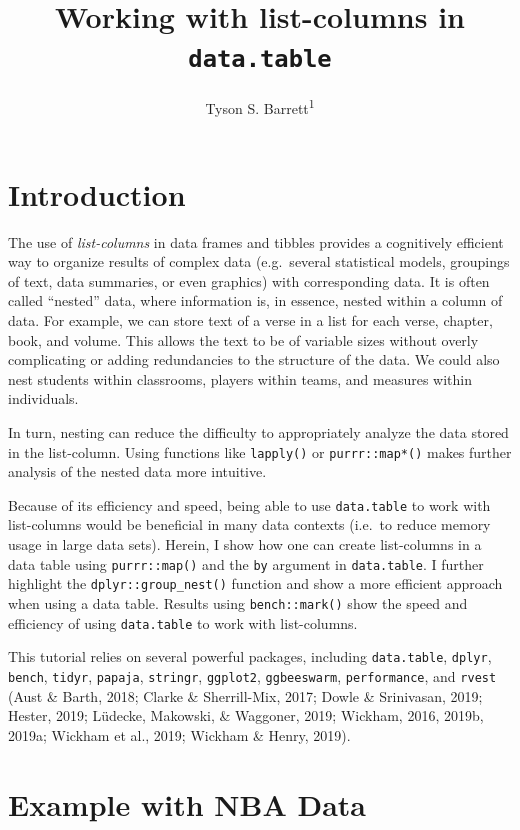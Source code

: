 \documentclass[doc]{apa6}
\title{Working with list-columns in \texttt{data.table}}
\author{Tyson S. Barrett\textsuperscript{1}}
\date{}
\affiliation{
\vspace{0.5cm}
\textsuperscript{1} Utah State University}
\begin{document}
\maketitle

\hypertarget{introduction}{%
\section{Introduction}\label{introduction}}

The use of \emph{list-columns} in data frames and tibbles provides a cognitively efficient way to organize results of complex data (e.g.~several statistical models, groupings of text, data summaries, or even graphics) with corresponding data. It is often called \enquote{nested} data, where information is, in essence, nested within a column of data. For example, we can store text of a verse in a list for each verse, chapter, book, and volume. This allows the text to be of variable sizes without overly complicating or adding redundancies to the structure of the data. We could also nest students within classrooms, players within teams, and measures within individuals.

In turn, nesting can reduce the difficulty to appropriately analyze the data stored in the list-column. Using functions like \texttt{lapply()} or \texttt{purrr::map*()} makes further analysis of the nested data more intuitive.

Because of its efficiency and speed, being able to use \texttt{data.table} to work with list-columns would be beneficial in many data contexts (i.e.~to reduce memory usage in large data sets). Herein, I show how one can create list-columns in a data table using \texttt{purrr::map()} and the \texttt{by} argument in \texttt{data.table}. I further highlight the \texttt{dplyr::group\_nest()} function and show a more efficient approach when using a data table. Results using \texttt{bench::mark()} show the speed and efficiency of using \texttt{data.table} to work with list-columns.

This tutorial relies on several powerful packages, including \texttt{data.table}, \texttt{dplyr}, \texttt{bench}, \texttt{tidyr}, \texttt{papaja}, \texttt{stringr}, \texttt{ggplot2}, \texttt{ggbeeswarm}, \texttt{performance}, and \texttt{rvest} (Aust \& Barth, 2018; Clarke \& Sherrill-Mix, 2017; Dowle \& Srinivasan, 2019; Hester, 2019; Lüdecke, Makowski, \& Waggoner, 2019; Wickham, 2016, 2019b, 2019a; Wickham et al., 2019; Wickham \& Henry, 2019).

\hypertarget{example-with-nba-data}{%
\section{Example with NBA Data}\label{example-with-nba-data}}
\end{document}
